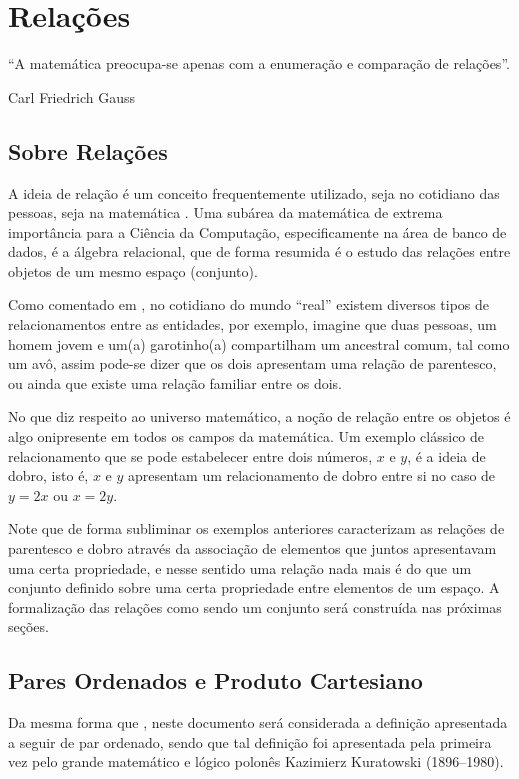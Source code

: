 \chapter{Relações}\label{cap:Relations}

\epigraph{``A matemática preocupa-se apenas com a enumeração e comparação de relações''.}{Carl Friedrich Gauss}

\section{Sobre Relações}\label{sec:SobreRelacoes}

A ideia de relação é um conceito frequentemente utilizado, seja no cotidiano das pessoas, seja na matemática \cite{barreto}. Uma subárea da matemática de extrema importância para a Ciência da Computação, especificamente na área de banco de dados, é a álgebra relacional, que de forma resumida é o estudo das relações entre objetos de um mesmo espaço (conjunto).

Como comentado em \cite{epp1990}, no cotidiano do mundo ``real'' existem diversos tipos de relacionamentos entre as entidades, por exemplo, imagine que duas pessoas, um homem jovem e um(a) garotinho(a) compartilham um ancestral comum, tal como um avô, assim pode-se dizer que os dois apresentam uma relação de parentesco, ou ainda que existe uma relação familiar entre os dois.

No que diz respeito ao universo matemático, a noção de relação entre os objetos é algo onipresente em todos os campos da matemática. Um exemplo clássico de relacionamento que se pode estabelecer entre dois números, $x$ e $y$, é a ideia de dobro, isto é, $x$ e $y$ apresentam um relacionamento de dobro entre si no caso de $y = 2x$ ou $x = 2y$.

Note que de forma subliminar os exemplos anteriores caracterizam as relações de parentesco e dobro através da associação de elementos que juntos apresentavam uma certa propriedade, e nesse sentido uma relação nada mais é do que um conjunto definido sobre uma certa propriedade entre elementos de um espaço. A formalização das relações como sendo um conjunto será construída nas próximas seções.

\section{Pares Ordenados e Produto Cartesiano}\label{sec:ParesOrdenadosProdutoCartesiano}

Da mesma forma que \cite{abe1991-TC}, neste documento será considerada a definição apresentada a seguir de par ordenado, sendo que tal definição foi apresentada pela primeira vez pelo grande matemático e lógico polonês Kazimierz Kuratowski (1896--1980).

